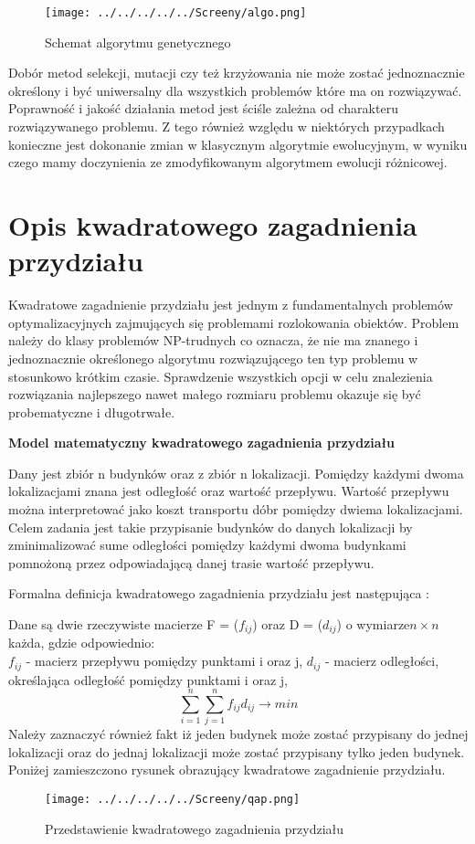 \begin{figure}[h!]
\begin{center}
		\texttt{[image: ../../../../../Screeny/algo.png]}
		\caption{Schemat algorytmu genetycznego}
		\label{algo}		
\end{center}	
\end{figure}

Dobór metod selekcji, mutacji czy też krzyżowania nie może zostać jednoznacznie określony i być uniwersalny dla wszystkich problemów które ma on rozwiązywać. Poprawność i jakość działania metod jest ściśle zależna od charakteru rozwiązywanego problemu. Z tego również względu w niektórych przypadkach konieczne jest dokonanie zmian w klasycznym algorytmie ewolucyjnym, w wyniku czego mamy doczynienia ze zmodyfikowanym algorytmem ewolucji różnicowej.

\section{Opis kwadratowego zagadnienia przydziału}\label{sec:strukturaDokumentu}

Kwadratowe zagadnienie przydziału jest jednym z fundamentalnych problemów optymalizacyjnych zajmujących się problemami rozlokowania obiektów. Problem należy do klasy problemów NP-trudnych co oznacza, że nie ma znanego i jednoznacznie określonego algorytmu rozwiązującego ten typ problemu w stosunkowo krótkim czasie. Sprawdzenie wszystkich opcji w celu znalezienia rozwiązania najlepszego nawet małego rozmiaru problemu okazuje się być probematyczne i długotrwałe.\\
\par
\textbf{Model matematyczny kwadratowego zagadnienia przydziału}\\
\par
Dany jest zbiór n budynków oraz z zbiór n lokalizacji. Pomiędzy każdymi dwoma lokalizacjami znana jest odległość oraz wartość przepływu. Wartość przepływu można interpretować jako koszt transportu dóbr pomiędzy dwiema lokalizacjami. Celem zadania jest takie przypisanie budynków do danych lokalizacji by zminimalizować sume odległości pomiędzy każdymi dwoma budynkami pomnożoną przez odpowiadającą danej trasie wartość przepływu.

Formalna definicja kwadratowego zagadnienia przydziału jest następująca :

Dane są dwie rzeczywiste macierze F = ($f_{ij}$) oraz D = ($d_{ij}$) o wymiarze$ n \times n $każda, gdzie odpowiednio:\\
$f_{ij}$ - macierz przepływu pomiędzy punktami i oraz j,
$d_{ij}$ - macierz odległości, określająca odległość pomiędzy punktami i oraz j,
$$
\sum_{i=1}^{n}\sum_{j=1}^{n}f_{ij}d_{ij} \longrightarrow min
$$
Należy zaznaczyć również fakt iż jeden budynek może zostać przypisany do jednej lokalizacji oraz do jednaj lokalizacji może zostać  przypisany tylko jeden budynek. Poniżej zamieszczono rysunek obrazujący kwadratowe zagadnienie przydziału.

\begin{figure}[h!]
\begin{center}
		\texttt{[image: ../../../../../Screeny/qap.png]}
		\caption{Przedstawienie kwadratowego zagadnienia przydziału}
		\label{algo}		
\end{center}	
\end{figure}

